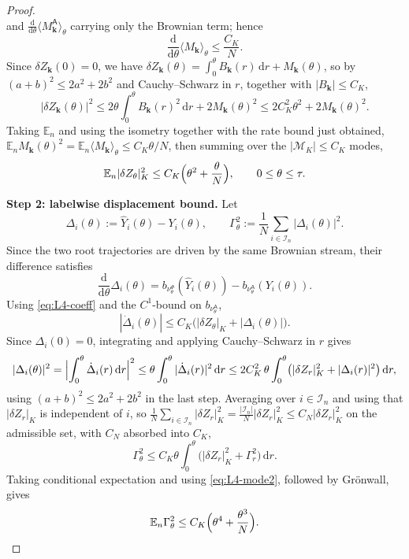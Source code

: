 \documentclass[a4paper,fleqn]{cas-sc}
\theoremstyle{definition}
\theoremstyle{remark}
\begin{document}
\begin{proof}
\[\]
and $\tfrac{\mathrm d}{\mathrm d\theta}\langle M_{\mathbf k}^{\mathsf A}\rangle_\theta$ carrying only the
Brownian term; hence
\[
\frac{\mathrm d}{\mathrm d\theta}\langle M_{\mathbf k}\rangle_\theta\le\frac{C_K}{N}.
\]
Since $\delta Z_{\mathbf k}(0)=0$, we have
$\delta Z_{\mathbf k}(\theta)=\int_0^\theta B_{\mathbf k}(r)\,\mathrm dr+M_{\mathbf k}(\theta)$,
so by $(a+b)^2\le2a^2+2b^2$ and Cauchy--Schwarz in $r$, together with $|B_{\mathbf k}|\le C_K$,
\[
|\delta Z_{\mathbf k}(\theta)|^2
\le 2\theta\int_0^\theta B_{\mathbf k}(r)^2\,\mathrm dr+2M_{\mathbf k}(\theta)^2
\le 2C_K^2\theta^2+2M_{\mathbf k}(\theta)^2 .
\]
Taking $\mathbb E_n$ and using the isometry together with the rate bound just obtained,
$\mathbb E_nM_{\mathbf k}(\theta)^2=\mathbb E_n\langle M_{\mathbf k}\rangle_\theta\le C_K\theta/N$,
then summing over the $|\mathcal M_K|\le C_K$ modes,
\begin{equation}\label{eq:L4-mode2}
\mathbb E_n|\delta Z_\theta|_K^2\le C_K\Bigl(\theta^2+\frac{\theta}{N}\Bigr),\qquad 0\le\theta\le\tau .
\end{equation}

\medskip
\noindent\textbf{Step 2: labelwise displacement bound.}
Let
\[
\Delta_i(\theta):=\widehat Y_i(\theta)-Y_i(\theta),\qquad
\Gamma_\theta^2:=\frac1N\sum_{i\in\mathcal I_n}|\Delta_i(\theta)|^2 .
\]
Since the two root trajectories are driven by the same Brownian stream, their difference
satisfies
\[
\frac{\mathrm d}{\mathrm d\theta}\Delta_i(\theta)
=b_{\nu^\Phi_\theta}(\widehat Y_i(\theta))-b_{\nu^{\mathsf A}_\theta}(Y_i(\theta)).
\]
Using \eqref{eq:L4-coeff} and the $C^1$-bound on $b_{\nu^{\mathsf A}_\theta}$,
\[
|\dot\Delta_i(\theta)|\le C_K\bigl(|\delta Z_\theta|_K+|\Delta_i(\theta)|\bigr).
\]
Since $\Delta_i(0)=0$, integrating and applying Cauchy--Schwarz in $r$ gives
\[
|\Delta_i(\theta)|^2
=\Bigl|\int_0^\theta\dot\Delta_i(r)\,\mathrm dr\Bigr|^2
\le\theta\int_0^\theta|\dot\Delta_i(r)|^2\,\mathrm dr
\le 2C_K^2\,\theta\int_0^\theta\bigl(|\delta Z_r|_K^2+|\Delta_i(r)|^2\bigr)\,\mathrm dr,
\]
using $(a+b)^2\le2a^2+2b^2$ in the last step. Averaging over $i\in\mathcal I_n$ and
using that $|\delta Z_r|_K$ is independent of $i$, so
$\frac1N\sum_{i\in\mathcal I_n}|\delta Z_r|_K^2=\frac{|\mathcal I_n|}{N}|\delta Z_r|_K^2\le C_N|\delta Z_r|_K^2$
on the admissible set, with $C_N$ absorbed into $C_K$,
\[
\Gamma_\theta^2\le C_K\theta\int_0^\theta\bigl(|\delta Z_r|_K^2+\Gamma_r^2\bigr)\,\mathrm dr .
\]
Taking conditional expectation and using \eqref{eq:L4-mode2}, followed by Gr\"onwall, gives
\begin{equation}\label{eq:L4-disp2}
\mathbb E_n\Gamma_\theta^2\le C_K\Bigl(\theta^4+\frac{\theta^3}{N}\Bigr).
\end{equation}


\end{proof}
\end{document}
